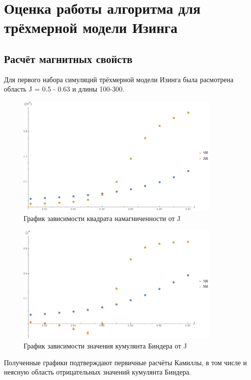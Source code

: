 \section{Оценка работы алгоритма для трёхмерной модели Изинга}

\subsection{Расчёт магнитных свойств}

Для первого набора симуляций трёхмерной модели Изинга была расмотрена область J = 0.5 - 0.63 и длины 100-300.

\begin{figure}[!h]
    \centering
    \includegraphics[width=100mm]{Sections/Images/m2_3D_50to60.png}
    \caption{График зависимости квадрата намагниченности от J}
    \label{fig:m2_3D}
\end{figure}

\begin{figure}[!h]
    \centering
    \includegraphics[width=100mm]{Sections/Images/U4_3D_50to60.png}
    \caption{График зависимости значения кумулянта Биндера от J}
    \label{fig:U4_3D}
\end{figure}

Полученные графики подтверждают первичные расчёты Камиллы, в том числе и неясную область отрицательных значений кумулянта Биндера.

\newpage